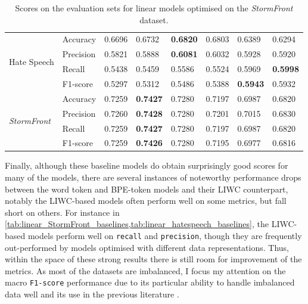\begin{table}
{\begin{tabular}{ll|ll|ll|ll}
    \multirow{4}{*}{Hate Speech}          & Accuracy  & 0.6696      & 0.6732        & \bf{0.6820} & 0.6803      & 0.6389      & 0.6294      \\
                                          & Precision & 0.5821      & 0.5888        & \bf{0.6081} & 0.6032      & 0.5928      & 0.5920      \\
                                          & Recall    & 0.5438      & 0.5459        & 0.5586      & 0.5524      & 0.5969      & \bf{0.5998} \\
                                          & F1-score  & 0.5297      & 0.5312        & 0.5486      & 0.5388      & \bf{0.5943} & 0.5932      \\\hline
    \multirow{4}{*}{\textit{StormFront}}  & Accuracy  & 0.7259      & \bf{0.7427}   & 0.7280      & 0.7197      & 0.6987      & 0.6820      \\
                                          & Precision & 0.7260      & \bf{0.7428}   & 0.7280      & 0.7201      & 0.7015      & 0.6830      \\
                                          & Recall    & 0.7259      & \bf{0.7427}   & 0.7280      & 0.7197      & 0.6987      & 0.6820      \\
                                          & F1-score  & 0.7259      & \bf{0.7426}   & 0.7280      & 0.7195      & 0.6977      & 0.6816
    \end{tabular}%
    }
    \caption{Scores on the evaluation sets for linear models optimised on the \textit{StormFront} dataset.}
    \label{tab:linear_StormFront_baselines}
\end{table}

Finally, although these baseline models do obtain surprisingly good scores for many of the models, there are several instances of noteworthy performance drops between the word token and BPE-token models and their LIWC counterpart, notably the LIWC-based models often perform well on some metrics, but fall short on others.
For instance in \cref{tab:linear_StormFront_baselines,tab:linear_hatespeech_baselines}, the LIWC-based models perform well on \texttt{recall} and \texttt{precision}, though they are frequently out-performed by models optimised with different data representations.
Thus, within the space of these strong results there is still room for improvement of the metrics.
As most of the datasets are imbalanced, I focus my attention on the macro \texttt{F1-score} performance due to its particular ability to handle imbalanced data well and its use in the previous literature \citep{Fortuna:2021}.

